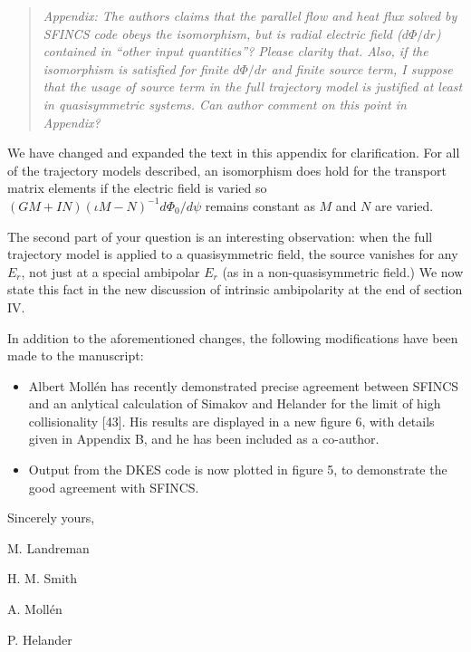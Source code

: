 \documentclass[11pt]{article}
\newenvironment{referee}{\begin{quote}\it\color{Blue}}{\end{quote}}
\begin{document}
\begin{referee}
Appendix: The authors claims that the parallel flow and heat flux solved by SFINCS code obeys the
isomorphism, but is radial electric field ($d\Phi/dr$) contained in ``other input quantities''? Please
clarity that. Also, if the isomorphism is satisfied for finite $d\Phi/dr$ and finite source term, I
suppose that the usage of source term in the full trajectory model is justified at least in
quasisymmetric systems. Can author comment on this point in Appendix?
\end{referee}

We have changed and expanded the text in this appendix for clarification. 
For all of the trajectory models described, an isomorphism does hold for the transport matrix elements
if the electric field is varied so
$(GM+IN)(\iota M-N)^{-1} d\Phi_0/d\psi$ remains constant as $M$ and $N$ are varied.

The second part of your question is an interesting observation: when the full trajectory model
is applied to a quasisymmetric field, the source vanishes for any $E_r$, not just at a special ambipolar $E_r$ (as in a non-quasisymmetric field.)
We now state this fact in the new discussion of intrinsic ambipolarity at the end of section IV.

\vspace{0.3in}


In addition to the aforementioned changes, the following modifications have been made to the manuscript:

\begin{itemize}
\item Albert Moll\'{e}n has recently demonstrated precise agreement between SFINCS and an anlytical calculation
of Simakov and Helander for the limit of high collisionality [43]. His results are displayed in a new figure 6, with details given in Appendix B,
 and he has been included as a co-author.
\item Output from the DKES code is now plotted in figure 5, to demonstrate the good agreement with SFINCS.
\end{itemize}


Sincerely yours,\newline

M. Landreman

H. M. Smith

A. Moll\'{e}n

P. Helander
\end{document}
